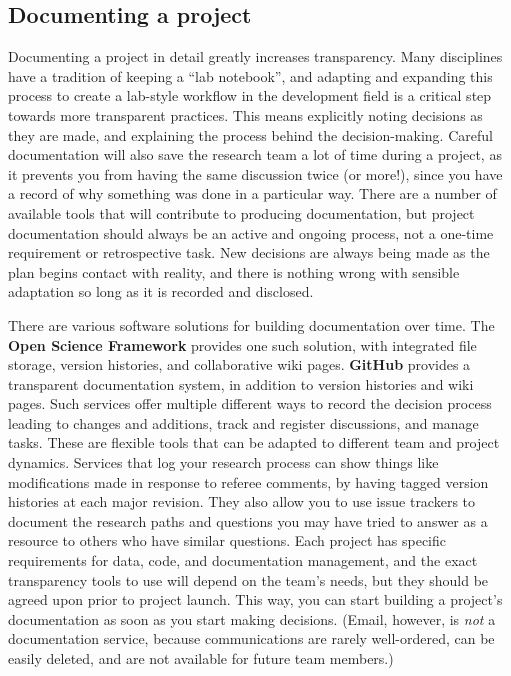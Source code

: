 \subsection{Documenting a project}

Documenting a project in detail greatly increases transparency.
Many disciplines have a tradition of keeping a ``lab notebook'',
and adapting and expanding this process to create a
lab-style workflow in the development field is a
critical step towards more transparent practices.
This means explicitly noting decisions as they are made,
and explaining the process behind the decision-making.
Careful documentation will also save the research team a lot of time during a project,
as it prevents you from having the same discussion twice (or more!),
since you have a record of why something was done in a particular way.
There are a number of available tools
that will contribute to producing documentation,
but project documentation should always be an active and ongoing process,
not a one-time requirement or retrospective task.
New decisions are always being made as the plan begins contact with reality,
and there is nothing wrong with sensible adaptation so long as it is recorded and disclosed.

There are various software solutions for building documentation over time.
The \textbf{Open Science Framework} provides one such solution,
with integrated file storage, version histories, and collaborative wiki pages.
\textbf{GitHub} provides a transparent documentation system,
in addition to version histories and wiki pages.
Such services offer multiple different ways
to record the decision process leading to changes and additions,
track and register discussions, and manage tasks.
These are flexible tools that can be adapted to different team and project dynamics.
Services that log your research process can show things like modifications made in response to referee comments,
by having tagged version histories at each major revision.
They also allow you to use issue trackers
to document the research paths and questions you may have tried to answer
as a resource to others who have similar questions.
Each project has specific requirements for data, code, and documentation management,
and the exact transparency tools to use will depend on the team's needs,
but they should be agreed upon prior to project launch.
This way, you can start building a project's documentation as soon as you start making decisions.
(Email, however, is \textit{not} a documentation service, because communications are rarely well-ordered,
can be easily deleted, and are not available for future team members.)

